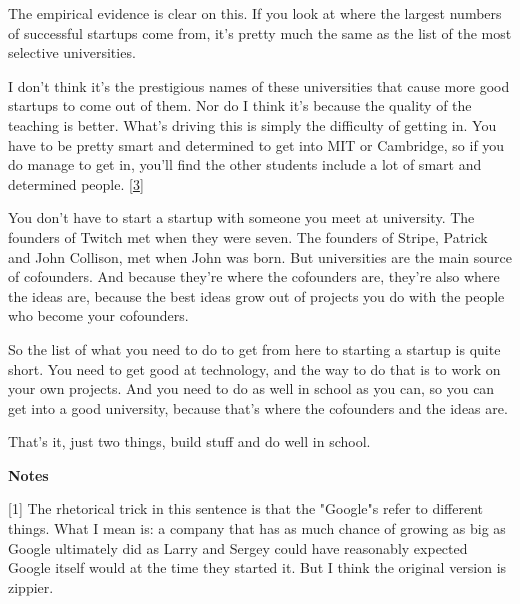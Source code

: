 The
                  empirical evidence is clear on this. If you look at where the
                  largest numbers of successful startups come from, it's pretty
                  much the same as the list of the most selective
                  universities.

I don't think it's the prestigious
                  names of these universities that cause more good startups to
                  come out of them. Nor do I think it's because the quality of
                  the teaching is better. What's driving this is simply the
                  difficulty of getting in. You have to be pretty smart and
                  determined to get into MIT or Cambridge, so if you do manage
                  to get in, you'll find the other students include a lot of
                  smart and determined people.
                  [\href{\#f3n}{3}]

You don't have to start a startup with someone
                  you meet at university. The founders of Twitch met when they
                  were seven. The founders of Stripe, Patrick and John Collison,
                  met when John was born. But universities are the main source
                  of cofounders. And because they're where the cofounders are,
                  they're also where the ideas are, because the best ideas grow
                  out of projects you do with the people who become your
                  cofounders.

So the list of what you need to do to
                  get from here to starting a startup is quite short. You need
                  to get good at technology, and the way to do that is to work
                  on your own projects. And you need to do as well in school as
                  you can, so you can get into a good university, because that's
                  where the cofounders and the ideas are.

That's it,
                  just two things, build stuff and do well in school.









\textbf{Notes}

[1] The rhetorical trick in this sentence is that the "Google"s
                  refer to different things. What I mean is: a company that has
                  as much chance of growing as big as Google ultimately did as
                  Larry and Sergey could have reasonably expected Google itself
                  would at the time they started it. But I think the original
                  version is zippier.

